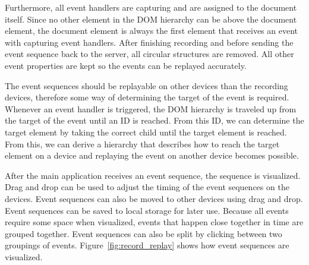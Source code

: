 Furthermore, all event handlers are capturing and are assigned to the document itself. Since no other element in the DOM hierarchy can be above the document element, the document element is always the first element that receives an event with capturing event handlers. After finishing recording and before sending the event sequence back to the server, all circular structures are removed. All other event properties are kept so the events can be replayed accurately.

The event sequences should be replayable on other devices than the recording devices, therefore some way of determining the target of the event is required. Whenever an event handler is triggered, the DOM hierarchy is traveled up from the target of the event until an ID is reached. From this ID, we can determine the target element by taking the correct child until the target element is reached. From this, we can derive a hierarchy that describes how to reach the target element on a device and replaying the event on another device becomes possible.

After the main application receives an event sequence, the sequence is visualized. Drag and drop can be used to adjust the timing of the event sequences on the devices. Event sequences can also be moved to other devices using drag and drop. Event sequences can be saved to local storage for later use. Because all events require some space when visualized, events that happen close together in time are grouped together. Event sequences can also be split by clicking between two groupings of events. Figure~\ref{fig:record_replay} shows how event sequences are visualized.

